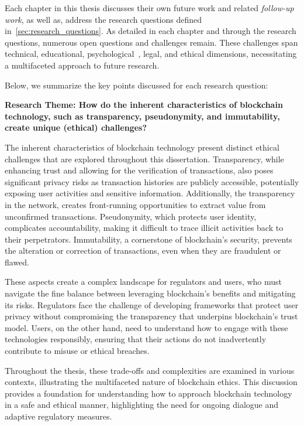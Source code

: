 Each chapter in this thesis discusses their own future work and related \textit{follow-up work}, as well as, address the research questions defined in~\ref{sec:research_questions}. As detailed in each chapter and through the research questions, numerous open questions and challenges remain. These challenges span technical, educational, psychological~\cite{gaggioli2019middleman}, legal, and ethical dimensions, necessitating a multifaceted approach to future research.

Below, we summarize the key points discussed for each research question:


\textbf{Research Theme: How do the inherent characteristics of blockchain technology, such as transparency, pseudonymity, and immutability, create unique (ethical) challenges?}

The inherent characteristics of blockchain technology present distinct ethical challenges that are explored throughout this dissertation. Transparency, while enhancing trust and allowing for the verification of transactions, also poses significant privacy risks as transaction histories are publicly accessible, potentially exposing user activities and sensitive information. Additionally, the transparency in the network, creates front-running opportunities to extract value from unconfirmed transactions. Pseudonymity, which protects user identity, complicates accountability, making it difficult to trace illicit activities back to their perpetrators. Immutability, a cornerstone of blockchain's security, prevents the alteration or correction of transactions, even when they are fraudulent or flawed.

These aspects create a complex landscape for regulators and users, who must navigate the fine balance between leveraging blockchain's benefits and mitigating its risks. Regulators face the challenge of developing frameworks that protect user privacy without compromising the transparency that underpins blockchain's trust model. Users, on the other hand, need to understand how to engage with these technologies responsibly, ensuring that their actions do not inadvertently contribute to misuse or ethical breaches.

Throughout the thesis, these trade-offs and complexities are examined in various contexts, illustrating the multifaceted nature of blockchain ethics. This discussion provides a foundation for understanding how to approach blockchain technology in a safe and ethical manner, highlighting the need for ongoing dialogue and adaptive regulatory measures.


